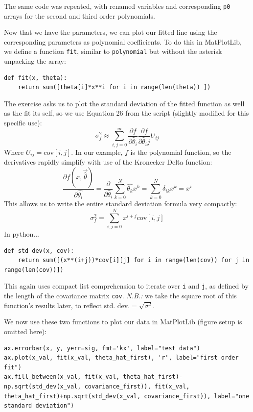 \documentclass[a4paper]{article}
\begin{document}
The same code was repeated, with renamed variables and corresponding \lstinline$p0$ arrays for the second and third order polynomials.

Now that we have the parameters, we can plot our fitted line using the corresponding parameters as polynomial coefficients. To do this in MatPlotLib, we define a function \lstinline$fit$, similar to \lstinline$polynomial$ but without the asterisk unpacking the array:
\begin{lstlisting}
def fit(x, theta): 
	return sum([theta[i]*x**i for i in range(len(theta)) ])
\end{lstlisting}

The exercise asks us to plot the standard deviation of the fitted function as well as the fit its self, so we use Equation 26 from the script (slightly modified for this specific use):
\begin{equation}
\sigma^2_f\approx\sum^m_{i,j=0}\frac{\partial f}{\partial\hat\theta_i}\frac{\partial f}{\partial\hat\theta_ij}U_{ij}
\end{equation}
Where $U_{ij} = \text{cov}[i, j]$. In our example, $f$ is the polynomial function, so the derivatives rapidly simplify with use of the Kronecker Delta function:
\begin{equation}
\frac{\partial f(x, \vec{\hat\theta})}{\partial\hat{\theta_i}} = \frac\partial{\partial\hat\theta_i}\sum^N_{k=0}\hat{\theta_k}x^k=\sum^N_{k=0}\delta_{ik}x^k=x^i
\end{equation}
This allows us to write the entire standard deviation formula very compactly:
\begin{equation}
\sigma^2_f=\sum^N_{i,j=0}x^{i+j}\text{cov}[i, j]
\end{equation}
In python...
\begin{lstlisting}
def std_dev(x, cov): 
	return sum([(x**(i+j))*cov[i][j] for i in range(len(cov)) for j in range(len(cov))])
\end{lstlisting}
This again uses compact list comprehension to iterate over \lstinline$i$ and \lstinline$j$, as defined by the length of the covariance matrix \lstinline$cov$. \emph{N.B.:} we take the square root of this function's results later, to reflect $\text{std. dev.}=\sqrt{\sigma^2}$.

We now use these two functions to plot our data in MatPlotLib (figure setup is omitted here):
\begin{lstlisting}
ax.errorbar(x, y, yerr=sig, fmt='kx', label="test data")
ax.plot(x_val, fit(x_val, theta_hat_first), 'r', label="first order fit")
ax.fill_between(x_val, fit(x_val, theta_hat_first)-np.sqrt(std_dev(x_val, covariance_first)), fit(x_val, theta_hat_first)+np.sqrt(std_dev(x_val, covariance_first)), label="one standard deviation")
\end{lstlisting}
\end{document}
